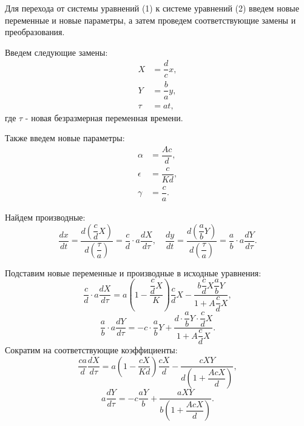 \documentclass[a4paper,14pt]{extreport}
\begin{document}
    \par \hspace{0.8cm}Для перехода от системы уравнений (1) к системе уравнений (2) введем новые переменные и новые параметры, а затем проведем соответствующие замены и преобразования.

    Введем следующие замены:
    \begin{align*}
    X &= \dfrac{d}{c} x, \\
    Y &= \dfrac{b}{a} y, \\
    \tau &= at,
    \end{align*}
    где $\tau$ - новая безразмерная переменная времени.
    
    Также введем новые параметры:
    \begin{align*}
    \alpha &= \dfrac{Ac}{d}, \\
    \epsilon &= \dfrac{c}{Kd}, \\
    \gamma &= \dfrac{c}{a}.
    \end{align*}
    
    Найдем производные:
    \begin{equation*}
    \dfrac{dx}{dt} = \dfrac{d \left( \dfrac{c}{d} X \right)}{d \left( \dfrac{\tau}{a} \right)} = \dfrac{c}{d} \cdot a \dfrac{dX}{d\tau}, \quad \dfrac{dy}{dt} = \dfrac{d \left( \dfrac{a}{b} Y \right)}{d \left( \dfrac{\tau}{a} \right)} = \dfrac{a}{b} \cdot a \dfrac{dY}{d\tau}.
    \end{equation*}
    
    Подставим новые переменные и производные в исходные уравнения:
    \begin{equation*}
    \dfrac{c}{d} \cdot a \dfrac{dX}{d\tau} = a\left(1 - \dfrac{\dfrac{c}{d} X}{K}\right) \dfrac{c}{d} X - \dfrac{b \dfrac{c}{d} X \dfrac{a}{b} Y}{1 + A \dfrac{c}{d} X},
    \end{equation*}
    \begin{equation*}
    \dfrac{a}{b} \cdot a \dfrac{dY}{d\tau} = -c \cdot \dfrac{a}{b} Y + \dfrac{d \cdot \dfrac{a}{b} Y \cdot \dfrac{c}{d} X}{1 + A \dfrac{c}{d} X}.
    \end{equation*}
    \newpage
    Сократим на соответствующие коэффициенты:
    \begin{equation*}
    \dfrac{ca}{d} \dfrac{dX}{d\tau} = a \left(1 - \dfrac{cX}{Kd}\right) \dfrac{cX}{d} - \dfrac{cXY}{d(1 + \dfrac{AcX}{d})},
    \end{equation*}
    \begin{equation*}
    a \dfrac{dY}{d\tau} = -c \dfrac{aY}{b} + \dfrac{aXY}{b(1 + \dfrac{AcX}{d})}.
    \end{equation*}
    
\end{document}
